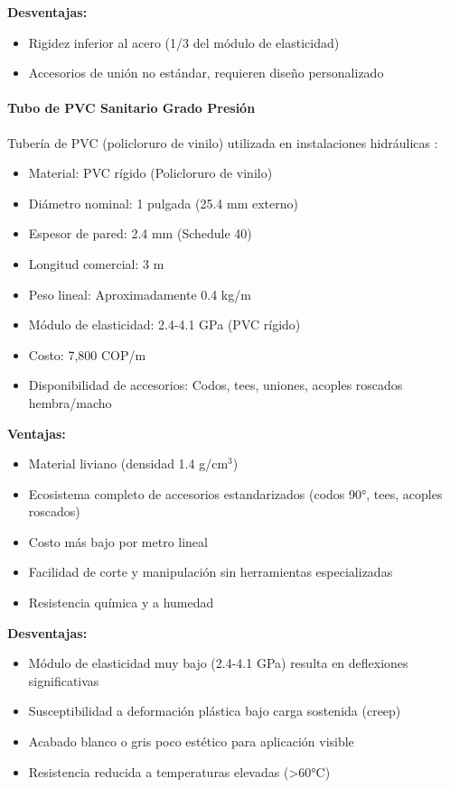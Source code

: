 \textbf{Desventajas:}
\begin{itemize}
    \item Rigidez inferior al acero (1/3 del módulo de elasticidad)
    \item Accesorios de unión no estándar, requieren diseño personalizado
\end{itemize}

\paragraph{Tubo de PVC Sanitario Grado Presión}

Tubería de PVC (policloruro de vinilo) utilizada en instalaciones hidráulicas \cite{PVC2024Sanitario}:

\begin{itemize}
    \item Material: PVC rígido (Policloruro de vinilo)
    \item Diámetro nominal: 1 pulgada (25.4 mm externo)
    \item Espesor de pared: 2.4 mm (Schedule 40)
    \item Longitud comercial: 3 m
    \item Peso lineal: Aproximadamente 0.4 kg/m
    \item Módulo de elasticidad: 2.4-4.1 GPa (PVC rígido)
    \item Costo: 7,800 COP/m
    \item Disponibilidad de accesorios: Codos, tees, uniones, acoples roscados hembra/macho
\end{itemize}

\textbf{Ventajas:}
\begin{itemize}
    \item Material liviano (densidad 1.4 g/cm$^3$)
    \item Ecosistema completo de accesorios estandarizados (codos 90°, tees, acoples roscados)
    \item Costo más bajo por metro lineal
    \item Facilidad de corte y manipulación sin herramientas especializadas
    \item Resistencia química y a humedad
\end{itemize}

\textbf{Desventajas:}
\begin{itemize}
    \item Módulo de elasticidad muy bajo (2.4-4.1 GPa) resulta en deflexiones significativas
    \item Susceptibilidad a deformación plástica bajo carga sostenida (creep)
    \item Acabado blanco o gris poco estético para aplicación visible
    \item Resistencia reducida a temperaturas elevadas (>60°C)
\end{itemize}

